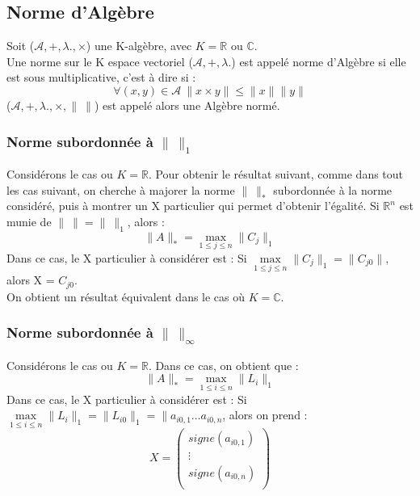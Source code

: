 \subsection{Norme d'Algèbre}
\begin{de}
Soit ($\mathcal{A},+,\lambda.,\times$) une K-algèbre, avec $K = \mathbb{R}$ ou $\mathbb{C}$.\\
Une norme sur le K espace vectoriel ($\mathcal{A},+,\lambda.$) est appelé norme d'Algèbre si elle est sous multiplicative, c'est à dire si :
$$\forall(x,y)\in \mathcal{A}~\parallel x \times y \parallel \leq \parallel x\parallel \parallel y \parallel$$
($\mathcal{A},+,\lambda.,\times,\parallel~\parallel$) est appelé alors une Algèbre normé.
\end{de}
\subsubsection{Norme subordonnée à $\parallel~\parallel_1$}
Considérons le cas ou $K=\mathbb{R}$. Pour obtenir le résultat suivant, comme dans tout les cas suivant, on cherche à majorer la norme $\parallel~\parallel_*$ subordonnée à la norme considéré, puis à montrer un X particulier qui permet d'obtenir l'égalité. Si $\mathbb{R}^n$ est munie de $\parallel~\parallel = \parallel~\parallel_1$, alors : 
$$\parallel A\parallel_* = \underset{1 \leq j \leq n}\max \parallel C_j \parallel_1$$
Dans ce cas, le X particulier à considérer est : Si $\underset{1 \leq j \leq n}\max \parallel C_j \parallel_1 = \parallel C_{j0} \parallel$, alors X = $C_{j0}$.\\
On obtient un résultat équivalent dans le cas où $K=\mathbb{C}$. 
\subsubsection{Norme subordonnée à $\parallel~\parallel_{\infty}$}
Considérons le cas ou $K = \mathbb{R}$. Dans ce cas, on obtient que : 
$$\parallel A\parallel_* = \underset{1 \leq i \leq n}\max\parallel L_i \parallel_1$$
Dans ce cas, le X particulier à considérer est : Si $\underset{1 \leq i \leq n}\max\parallel L_i \parallel_1 = \parallel L_{i0} \parallel_1 = \parallel a_{i0,1} \dots a_{i0,n}$, alors on prend :
$$X = \begin{pmatrix}
       signe(a_{i0,1}) \\
	\vdots \\
	signe(a_{i0,n}) \\
      \end{pmatrix}
$$
